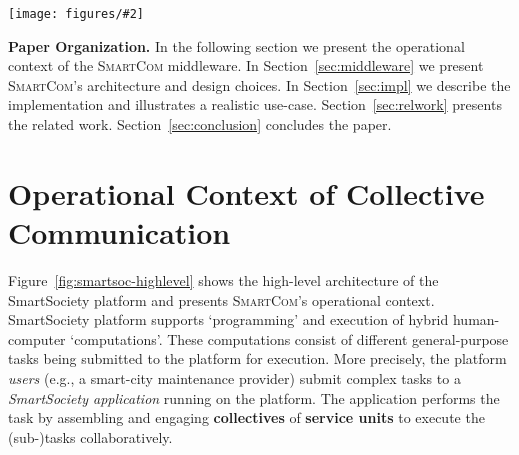 \documentclass{llncs}
\newcommand{\mdl}{\textsc{SmartCom}}
\newcommand{\figtop}[3][0.9]{
\begin{figure*}[h]
\centering
\texttt{[image: figures/\#2]}
\caption{#3}
\label{fig:#2}
\end{figure*}
}
\newcommand{\figtopl}[4][0.9]{
\begin{figure*}[h]
\centering
\texttt{[image: figures/\#2]}
\caption{#4}
\label{fig:#3}
\end{figure*}
}
\begin{document}
\figtopl[.85]{bw/smartsoc-highlevel}{smartsoc-highlevel}{Operational context for the \mdl{} middleware. Middleware components are marked with thick lines.}

\textbf{Paper Organization. }
  In the following section we present the operational context of the \mdl{} middleware. In Section~\ref{sec:middleware} we present \mdl's architecture and design choices. In Section~\ref{sec:impl} we  describe the implementation and illustrates a realistic use-case. Section~\ref{sec:relwork} presents the related work. Section~\ref{sec:conclusion} concludes the paper.

  \section{Operational Context of Collective Communication}
    \label{sec:intro:context}

      Figure~\ref{fig:smartsoc-highlevel} shows the high-level architecture of the SmartSociety platform and presents \mdl's operational context. SmartSociety platform supports `programming' and execution of hybrid human-computer `computations'. These computations consist of different general-purpose tasks being submitted to the platform for execution. More precisely, the platform \emph{users} (e.g., a smart-city maintenance provider) submit complex tasks to a \emph{SmartSociety application} running on the platform. The application performs the task by assembling and engaging \textbf{collectives} of \textbf{service units} to execute the (sub-)tasks collaboratively.
\end{document}
